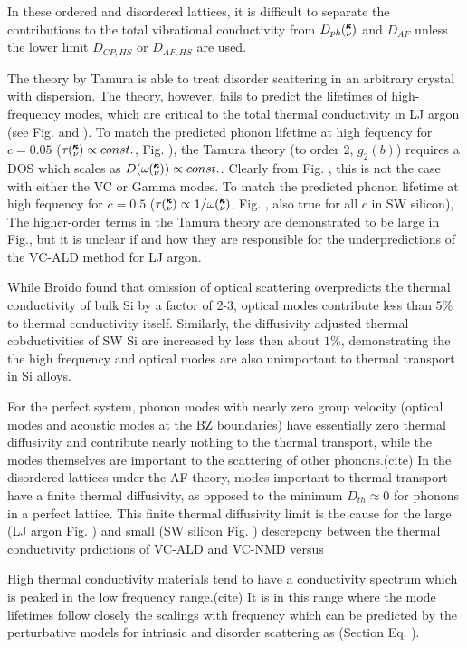 \documentclass[aps,prb,onecolumn,preprint,superscriptaddress,amsmath,amssymb,floatfix]{revtex4}
\newcommand{\kv}{\mspace{-4.0mu}\left(\mspace{-8.0mu}
\begin{smallmatrix}&\pmb{\kappa} \\&\nu\end{smallmatrix}
\mspace{-3.0mu}\right)}
\begin{document}
In these ordered and disordered lattices, it is difficult to separate 
the contributions to the total vibrational 
conductivity from $D_{ph}\kv$ and $D_{AF}$ unless the lower limit 
$D_{CP,HS}$ or $D_{AF,HS}$ are used.  

The theory by Tamura is able to treat disorder scattering in an arbitrary 
crystal with dispersion. The theory, however, fails to predict the 
lifetimes of high-frequency modes, which are critical to the total 
thermal conductivity in LJ argon (see Fig. and ). To match the predicted 
phonon lifetime at high fequency for $c=0.05$ 
($\tau\kv \propto const.$, Fig. ), 
the Tamura theory (to order 2, $g_2(b)$) requires a DOS which scales as 
$D(\omega\kv) \propto const.$. Clearly from Fig. , this is not the case 
with either the VC or Gamma modes. To match the predicted 
phonon lifetime at high fequency for $c=0.5$ 
($\tau\kv \propto 1/\omega\kv$, Fig. , also true for all $c$ in SW silicon), 
The higher-order terms in the Tamura theory are demonstrated to be large 
in Fig., but it is unclear if and how they are responsible for the 
underpredictions of the VC-ALD method for LJ argon. 

While Broido found that omission of optical scattering overpredicts 
the thermal 
conductivity of bulk Si by a factor of 2-3, 
optical modes contribute less than $5\%$ 
to thermal conductivity itself. Similarly, the diffusivity adjusted thermal 
cobductivities of SW Si are increased by less then about $1\%$, demonstrating the 
the high frequency and optical modes are also unimportant to thermal transport 
in Si alloys. 

For the perfect system, phonon modes with nearly zero group velocity 
(optical modes and acoustic modes at the BZ boundaries) have essentially 
zero thermal diffusivity and contribute nearly 
nothing to the thermal transport, while the modes themselves 
are important to the 
scattering of other phonons.(cite) In the disordered lattices under the 
AF theory, modes important to thermal transport have a finite thermal 
diffusivity, as opposed to  the minimum $D_{th} \approx 0 $ for phonons 
in a perfect lattice. This finite thermal diffusivity limit is the cause 
for the large (LJ argon Fig. ) and small (SW silicon Fig. ) 
descrepcny between the thermal conductivity prdictions of VC-ALD and 
VC-NMD versus 

High thermal conductivity materials tend to have a conductivity spectrum 
which is peaked in the low frequency range.(cite) 
It is in this range where the mode 
lifetimes follow closely the scalings with frequency which can be 
predicted by the perturbative models for intrinsic and disorder scattering as 
(Section Eq. ).
\end{document}
